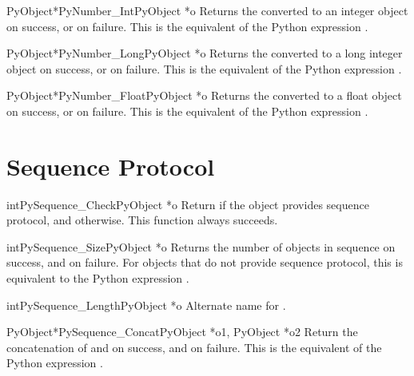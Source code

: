 \documentclass{manual}
\begin{document}
\begin{cfuncdesc}{PyObject*}{PyNumber_Int}{PyObject *o}
Returns the  converted to an integer object on success, or
\NULL{} on failure.  This is the equivalent of the Python
expression .
\end{cfuncdesc}

\begin{cfuncdesc}{PyObject*}{PyNumber_Long}{PyObject *o}
Returns the  converted to a long integer object on success,
or \NULL{} on failure.  This is the equivalent of the Python
expression .
\end{cfuncdesc}

\begin{cfuncdesc}{PyObject*}{PyNumber_Float}{PyObject *o}
Returns the  converted to a float object on success, or
\NULL{} on failure.  This is the equivalent of the Python expression
.
\end{cfuncdesc}


\section{Sequence Protocol \label{sequence}}

\begin{cfuncdesc}{int}{PySequence_Check}{PyObject *o}
Return  if the object provides sequence protocol, and
 otherwise.  This function always succeeds.
\end{cfuncdesc}

\begin{cfuncdesc}{int}{PySequence_Size}{PyObject *o}
Returns the number of objects in sequence  on success, and
 on failure.  For objects that do not provide sequence
protocol, this is equivalent to the Python expression
.
\end{cfuncdesc}

\begin{cfuncdesc}{int}{PySequence_Length}{PyObject *o}
Alternate name for .
\end{cfuncdesc}

\begin{cfuncdesc}{PyObject*}{PySequence_Concat}{PyObject *o1, PyObject *o2}
Return the concatenation of  and  on success, and \NULL{} on
failure.   This is the equivalent of the Python
expression .
\end{cfuncdesc}
\end{document}
